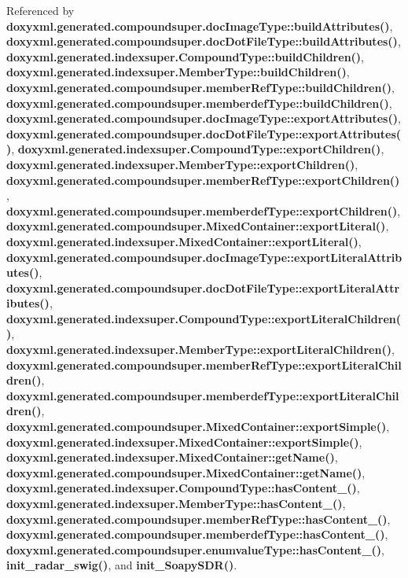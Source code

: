 Referenced by {\bf doxyxml.\+generated.\+compoundsuper.\+doc\+Image\+Type\+::build\+Attributes()}, {\bf doxyxml.\+generated.\+compoundsuper.\+doc\+Dot\+File\+Type\+::build\+Attributes()}, {\bf doxyxml.\+generated.\+indexsuper.\+Compound\+Type\+::build\+Children()}, {\bf doxyxml.\+generated.\+indexsuper.\+Member\+Type\+::build\+Children()}, {\bf doxyxml.\+generated.\+compoundsuper.\+member\+Ref\+Type\+::build\+Children()}, {\bf doxyxml.\+generated.\+compoundsuper.\+memberdef\+Type\+::build\+Children()}, {\bf doxyxml.\+generated.\+compoundsuper.\+doc\+Image\+Type\+::export\+Attributes()}, {\bf doxyxml.\+generated.\+compoundsuper.\+doc\+Dot\+File\+Type\+::export\+Attributes()}, {\bf doxyxml.\+generated.\+indexsuper.\+Compound\+Type\+::export\+Children()}, {\bf doxyxml.\+generated.\+indexsuper.\+Member\+Type\+::export\+Children()}, {\bf doxyxml.\+generated.\+compoundsuper.\+member\+Ref\+Type\+::export\+Children()}, {\bf doxyxml.\+generated.\+compoundsuper.\+memberdef\+Type\+::export\+Children()}, {\bf doxyxml.\+generated.\+compoundsuper.\+Mixed\+Container\+::export\+Literal()}, {\bf doxyxml.\+generated.\+indexsuper.\+Mixed\+Container\+::export\+Literal()}, {\bf doxyxml.\+generated.\+compoundsuper.\+doc\+Image\+Type\+::export\+Literal\+Attributes()}, {\bf doxyxml.\+generated.\+compoundsuper.\+doc\+Dot\+File\+Type\+::export\+Literal\+Attributes()}, {\bf doxyxml.\+generated.\+indexsuper.\+Compound\+Type\+::export\+Literal\+Children()}, {\bf doxyxml.\+generated.\+indexsuper.\+Member\+Type\+::export\+Literal\+Children()}, {\bf doxyxml.\+generated.\+compoundsuper.\+member\+Ref\+Type\+::export\+Literal\+Children()}, {\bf doxyxml.\+generated.\+compoundsuper.\+memberdef\+Type\+::export\+Literal\+Children()}, {\bf doxyxml.\+generated.\+compoundsuper.\+Mixed\+Container\+::export\+Simple()}, {\bf doxyxml.\+generated.\+indexsuper.\+Mixed\+Container\+::export\+Simple()}, {\bf doxyxml.\+generated.\+indexsuper.\+Mixed\+Container\+::get\+Name()}, {\bf doxyxml.\+generated.\+compoundsuper.\+Mixed\+Container\+::get\+Name()}, {\bf doxyxml.\+generated.\+indexsuper.\+Compound\+Type\+::has\+Content\+\_\+()}, {\bf doxyxml.\+generated.\+indexsuper.\+Member\+Type\+::has\+Content\+\_\+()}, {\bf doxyxml.\+generated.\+compoundsuper.\+member\+Ref\+Type\+::has\+Content\+\_\+()}, {\bf doxyxml.\+generated.\+compoundsuper.\+memberdef\+Type\+::has\+Content\+\_\+()}, {\bf doxyxml.\+generated.\+compoundsuper.\+enumvalue\+Type\+::has\+Content\+\_\+()}, {\bf init\+\_\+radar\+\_\+swig()}, and {\bf init\+\_\+\+Soapy\+S\+D\+R()}.

